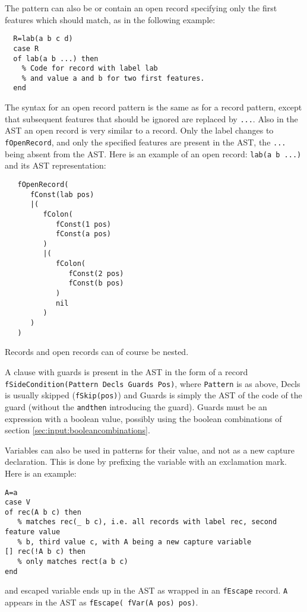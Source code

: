 \documentclass[a4paper]{memoir}
\begin{document}
The pattern can also be or contain an open record specifying only the first features which should match, as in the following example:
\begin{lstlisting}
  R=lab(a b c d)
  case R
  of lab(a b ...) then
    % Code for record with label lab
    % and value a and b for two first features.
  end
\end{lstlisting}
The syntax for an open record pattern is the same as for a record pattern, except that subsequent features that should be ignored are replaced by \lstinline!...!. Also in the AST an open record is very similar to a record. Only the label changes to \lstinline!fOpenRecord!, and only the specified features are present in the AST, the \lstinline!...! being absent from the AST. Here is an example of an open record:
\lstinline!lab(a b ...)! 
and its AST representation:
\begin{lstlisting}
   fOpenRecord(
      fConst(lab pos)
      |(
         fColon(
            fConst(1 pos)
            fConst(a pos)
         )
         |(
            fColon(
               fConst(2 pos)
               fConst(b pos)
            )
            nil
         )
      )
   )
\end{lstlisting}

Records and open records can of course be nested.

A clause with guards is present in the AST in the form of a record \lstinline!fSideCondition(Pattern Decls Guards Pos)!, where \lstinline!Pattern! is as above, Decls is usually skipped (\lstinline!fSkip(pos)!)%
and Guards is simply the AST of the code of the guard (without the \lstinline!andthen! introducing the guard).
Guards must be an expression with a boolean value, possibly using the boolean combinations of section \ref{sec:input:booleancombinations}.

Variables can also be used in patterns for their value, and not as a new capture
declaration. This is done by prefixing the variable with an exclamation mark.
Here is an example:

\begin{lstlisting}
A=a
case V
of rec(A b c) then
   % matches rec(_ b c), i.e. all records with label rec, second feature value
   % b, third value c, with A being a new capture variable
[] rec(!A b c) then
   % only matches rect(a b c)
end
\end{lstlisting}

and escaped variable ends up in the AST as wrapped in an \lstinline!fEscape!
record. \lstinline!A! appears in the AST as \lstinline!fEscape( fVar(A pos) pos)!.
\end{document}
